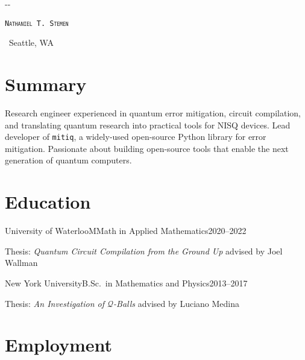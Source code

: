 \documentclass{cultvoucher}
\begin{document}
\begin{adjustwidth}{\dimexpr-\marginparsep-\marginparwidth}{}
	\begin{center}
		\textsc{\texttt{\HUGE Nathaniel T. Stemen}}

		 \separator{}\, Seattle, WA
	\end{center}
\end{adjustwidth}

\section{Summary}
\hfill\break
Research engineer experienced in quantum error mitigation, circuit compilation, and translating quantum research into practical tools for NISQ devices.
Lead developer of \texttt{mitiq}, a widely-used open-source Python library for error mitigation.
Passionate about building open-source tools that enable the next generation of quantum computers.

\section{Education}

\begin{entry}{University of Waterloo}{MMath in Applied Mathematics}{2020--2022}
	\item Thesis: \textit{Quantum Circuit Compilation from the Ground Up} advised by Joel Wallman
\end{entry}

\begin{entry}{New York University}{B.Sc.\ in Mathematics and Physics}{2013--2017}
	\item Thesis: \textit{An Investigation of $\mathcal{Q}$-Balls} advised by Luciano Medina
\end{entry}

\section{Employment}
\end{document}
